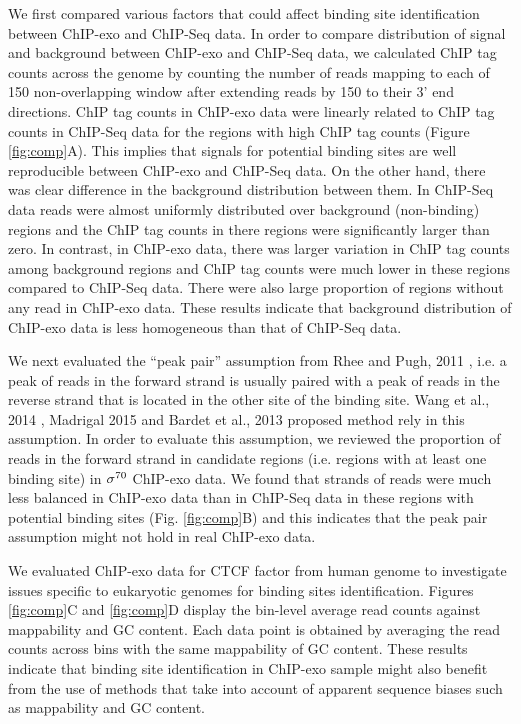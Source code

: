 \documentclass[11pt]{article}\usepackage[]{graphicx}\usepackage[]{color}
\begin{document}
We first compared various factors that could affect binding site
identification between ChIP-exo and ChIP-Seq data. In order to compare
distribution of signal and background between ChIP-exo and ChIP-Seq
data, we calculated ChIP tag counts across the genome by counting the
number of reads mapping to each of 150 non-overlapping
window after extending reads by 150 to their 3' end
directions. ChIP tag counts in ChIP-exo data were linearly related to
ChIP tag counts in ChIP-Seq data for the regions with high ChIP tag
counts (Figure \ref{fig:comp}A). This implies that signals for
potential binding sites are well reproducible between ChIP-exo and
ChIP-Seq data. On the other hand, there was clear difference in the
background distribution between them. In ChIP-Seq data reads were
almost uniformly distributed over background (non-binding) regions and
the ChIP tag counts in there regions were significantly larger than
zero. In contrast, in ChIP-exo data, there was larger variation in
ChIP tag counts among background regions and ChIP tag counts were much
lower in these regions compared to ChIP-Seq data. There were also
large proportion of regions without any read in ChIP-exo data. These
results indicate that background distribution of ChIP-exo data is less
homogeneous than that of ChIP-Seq data.

We next evaluated the ``peak pair'' assumption from Rhee and Pugh,
2011 \cite{exo1}, i.e. a peak of reads in the forward strand is
usually paired with a peak of reads in the reverse strand that is
located in the other site of the binding site. Wang et al., 2014
\cite{mace}, Madrigal 2015 \cite{cexor} and Bardet et al., 2013
\cite{peakzilla} proposed method rely in this assumption. In order to
evaluate this assumption, we reviewed the proportion of reads in the
forward strand in candidate regions (i.e. regions with at least one
binding site) in $\sigma^{70}$ ChIP-exo data. We found that strands of reads
were much less balanced in ChIP-exo data than in ChIP-Seq data in
these regions with potential binding sites (Fig. \ref{fig:comp}B) and
this indicates that the peak pair assumption might not hold in real
ChIP-exo data.

We evaluated ChIP-exo data for CTCF factor from human genome
\cite{exo1} to investigate issues specific to eukaryotic genomes for
binding sites identification. Figures \ref{fig:comp}C and
\ref{fig:comp}D display the bin-level average read counts against
mappability and GC content. Each data point is obtained by averaging
the read counts across bins with the same mappability of GC
content. These results indicate that binding site identification in
ChIP-exo sample might also benefit from the use of methods that take
into account of apparent sequence biases such as mappability and GC
content.
\end{document}
